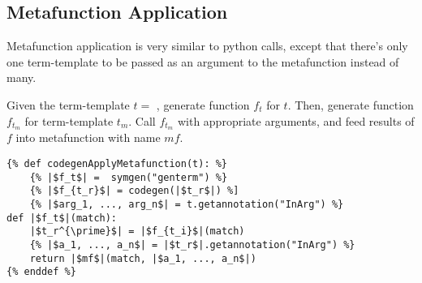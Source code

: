 \subsection{Metafunction Application}
Metafunction application is very similar to python calls, except that there's only one term-template to be passed as an argument to the metafunction instead of many.

Given the term-template $t=$ \ApplyMetafunction, generate function $f_t$ for $t$. Then, generate function $f_{t_m}$ for term-template $t_m$. Call $f_{t_m}$ with appropriate arguments, and feed results of $f$ into metafunction with name $mf$.

\begin{verbatim}
{% def codegenApplyMetafunction(t): %}
	{% |$f_t$| =  symgen("genterm") %}
	{% |$f_{t_r}$| = codegen(|$t_r$|) %]
	{% |$arg_1, ..., arg_n$| = t.getannotation("InArg") %}
def |$f_t$|(match):
	|$t_r^{\prime}$| = |$f_{t_i}$|(match)
	{% |$a_1, ..., a_n$| = |$t_r$|.getannotation("InArg") %}
	return |$mf$|(match, |$a_1, ..., a_n$|) 
{% enddef %}
\end{verbatim}

